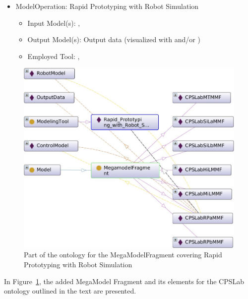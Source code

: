 
\begin{itemize}
    \item ModelOperation: Rapid Prototyping with Robot Simulation
    \begin{itemize}
        \item Input Model(s): \CPSLabControlModel, \CPSLabRobotModel
        \item Output Model(s): Output data (visualized with \MATLABSimulinkSimulator and/or \FESTORobotinoView)
        \item Employed Tool: \MATLABSimulinkSimulator, \FESTORobotinoSim {}
    \end{itemize}
\end{itemize}


\begin{figure}[!htb]
\centering
\includegraphics[scale=0.333]{figures/CPSLabRPaMMF.jpg}
\caption{Part of the ontology for the MegaModelFragment \CPSLabRPaMMF covering Rapid Prototyping with Robot Simulation}
\label{fig:CPSLabRPaMMF}
\end{figure}


In Figure~\ref{fig:CPSLabRPaMMF}, the added MegaModel Fragment \CPSLabRPaMMF and its elements for the CPSLab ontology outlined in the text are presented.


